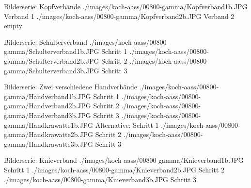 \begin{PictureSeriesWide}{}{Bilderserie:
Kopfverbände\label{fig:mitella-kopfverband}}
{./images/koch-aass/00800-gamma/Kopfverband1b.JPG}
{Verband 1}
{./images/koch-aass/00800-gamma/Kopfverband2b.JPG}
{Verband 2}
{empty}
{}
{}
{}
\end{PictureSeriesWide}

\begin{PictureSeriesWide}{}{Bilderserie:
Schulterverband\label{fig:mitella-schulterverband}}
{./images/koch-aass/00800-gamma/Schulterverband1b.JPG}
{Schritt 1}
{./images/koch-aass/00800-gamma/Schulterverband2b.JPG}
{Schritt 2}
{./images/koch-aass/00800-gamma/Schulterverband3b.JPG}
{Schritt 3}
{}
{}
\end{PictureSeriesWide}



\begin{PictureSeriesWide}{}{Bilderserie: Zwei verschiedene
Handverbände\label{fig:mitella-handverband}}
{./images/koch-aass/00800-gamma/Handverband1b.JPG}
{Schritt 1}
{./images/koch-aass/00800-gamma/Handverband2b.JPG}
{Schritt 2}
{./images/koch-aass/00800-gamma/Handverband3b.JPG}
{Schritt 3}
{}
{}
{./images/koch-aass/00800-gamma/Handkrawatte1b.JPG}
{Alternative: Schritt 1}
{./images/koch-aass/00800-gamma/Handkrawatte2b.JPG}
{Schritt 2}
{./images/koch-aass/00800-gamma/Handkrawatte3b.JPG}
{Schritt 3}
{}
{}
\end{PictureSeriesWide}

\begin{PictureSeriesWide}{}{Bilderserie:
Knieverband\label{fig:mitella-knieverband}}
{./images/koch-aass/00800-gamma/Knieverband1b.JPG}
{Schritt 1}
{./images/koch-aass/00800-gamma/Knieverband2b.JPG}
{Schritt 2}
{./images/koch-aass/00800-gamma/Knieverband3b.JPG}
{Schritt 3}
{}
{}
\end{PictureSeriesWide}








\nocite{BuchfelderErsteHilfe4,Erc2005Sec9,Erc2005Sec2,Erc2005Sec8,Erc2005Sec6,WirthEH,HolaubekASB16h,KoehnleinEH,KeggenhoffEH,KarutzKursbuchEH}



\ChapterEnd
